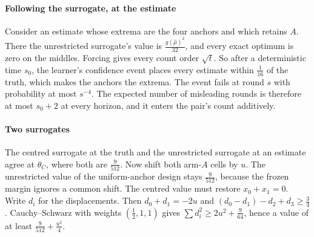
\paragraph{Following the surrogate, at the estimate} Consider an estimate whose extrema are the
four anchors and which retains $A$. There the unrestricted surrogate's value is
$\frac{g(\hat\mu)^{2}}{32}$, and every exact optimum is zero on the middles. Forcing gives
every count order $\sqrt t$. So after a deterministic time $s_{0}$, the learner's confidence
event places every estimate within $\frac1{16}$ of the truth, which makes the anchors the
extrema. The event fails at round $s$ with probability at most $s^{-4}$. The expected number of
misleading rounds is therefore at most $s_{0}+2$ at every horizon, and it enters the pair's count
additively.


\paragraph{Two surrogates} The centred surrogate at the truth and the unrestricted surrogate at
an estimate agree at $\theta_{C}$, where both are $\frac{9}{512}$. Now shift both arm-$A$ cells by
$u$. The unrestricted value of the uniform-anchor design stays $\frac{9}{512}$, because the
frozen margin ignores a common shift. The centred value must restore $x_{0}+x_{1}=0$. Write
$d_{i}$ for the displacements. Then $d_{0}+d_{1}=-2u$ and $(d_{0}-d_{1})-d_{2}+d_{3}\ge\frac34$.
Cauchy--Schwarz with weights $(\frac12,1,1)$ gives $\sum d_{i}^{2}\ge2u^{2}+\frac{9}{64}$, hence
a value of at least $\frac{9}{512}+\frac{u^{2}}{4}$.

